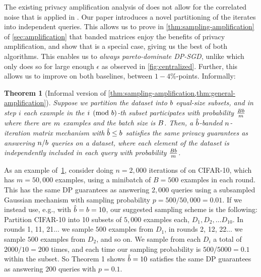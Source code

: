 \documentclass{article}
\newtheorem{theorem}{Theorem}
\begin{document}
The existing privacy amplification analysis of \dpsgd does not allow for the correlated noise that is applied in \mfftrl. Our paper introduces a novel partitioning of the \BANDMF iterates into independent queries.
This allows us to prove in \cref{thm:sampling-amplification} of \cref{sec:amplification} that banded matrices enjoy the benefits of privacy amplification, and show that \dpsgd is a special case, giving us the best of both algorithms. This enables us to \emph{always pareto-dominate DP-SGD}, unlike \citet{choquette2022multi} which only does so for large enough $\epsilon$ as observed in \cref{fig:centralized}. Further, this allows us to improve on both baselines, between $1-4\%$-points. Informally:
%
\begin{theorem}[Informal version of \cref{thm:sampling-amplification,thm:general-amplification}]\label{thm:amplification-informal}
Suppose we partition the dataset into $b$ equal-size subsets, and in step $i$ each example in the $i \pmod {b}$-th subset participates with probability $\frac{B b}{m}$ where there are $m$ examples and the batch size is $B$.  Then, a $\hat{b}$-banded $n$-iteration matrix mechanism with $\hat{b} \le b$ satisfies the same privacy guarantees as answering $n / b$ queries on a dataset, where each element of the dataset is independently included in each query with probability $\frac{B b}{m}$.
%
\end{theorem}
%
As an example of~\cref{thm:amplification-informal}, consider doing $n=2,000$ iterations of \DPSGD on CIFAR-10, which has $m=50,000$ examples, using a minibatch of $B=500$ examples in each round. This has the same DP guarantees as answering $2,000$ queries using a subsampled Gaussian mechanism with sampling probability $p=500/50,000 = 0.01$. If we instead use, e.g., \BANDMF with $\hat{b} = b = 10$, our suggested sampling scheme is the following: Partition CIFAR-10 into 10 subsets of $5,000$ examples each, $D_1, D_2, … D_{10}$. In rounds 1, 11, 21... we sample $500$ examples from $D_1$, in rounds 2, 12, 22... we sample $500$ examples from $D_2$, and so on. We sample from each $D_i$ a total of $2000/10 = 200$ times, and each time our sampling probability is $500/5000 = 0.1$ within the subset. So Theorem 1 shows $\hat{b}=10$ \BANDMF satisfies the same DP guarantees as answering $200$ queries with $p=0.1$.
\end{document}

